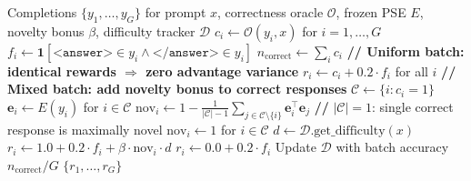 \begin{algorithm}[t]
\caption{SuS Reward Computation}
\label{alg:sus}
\begin{algorithmic}[1]
\REQUIRE Completions $\{y_1, \ldots, y_G\}$ for prompt $x$, correctness oracle $\mathcal{O}$, frozen PSE $E$, novelty bonus $\beta$, difficulty tracker $\mathcal{D}$
\STATE $c_i \gets \mathcal{O}(y_i, x)$ for $i = 1, \ldots, G$ 
\STATE $f_i \gets \mathbf{1}[\texttt{<answer>} \in y_i \wedge \texttt{</answer>} \in y_i]$ 
\STATE $n_{\text{correct}} \gets \sum_{i} c_i$
    \STATE \textbf{// Uniform batch: identical rewards $\Rightarrow$ zero advantage variance}
    \STATE $r_i \gets c_i + 0.2 \cdot f_i$ for all $i$
\ELSE
    \STATE \textbf{// Mixed batch: add novelty bonus to correct responses}
    \STATE $\mathcal{C} \gets \{i : c_i = 1\}$ 
        \STATE $\mathbf{e}_i \gets E(y_i)$ for $i \in \mathcal{C}$ 
        \STATE $\text{nov}_i \gets 1 - \frac{1}{|\mathcal{C}|-1} \sum_{j \in \mathcal{C} \setminus \{i\}} \mathbf{e}_i^\top \mathbf{e}_j$ 
    \ELSE
        \STATE \textbf{//} $|\mathcal{C}| = 1$: single correct response is maximally novel
        \STATE $\text{nov}_i \gets 1$ for $i \in \mathcal{C}$
    \ENDIF
    \STATE $d \gets \mathcal{D}.\text{get\_difficulty}(x)$ 
            \STATE $r_i \gets 1.0 + 0.2 \cdot f_i + \beta \cdot \text{nov}_i \cdot d$
        \ELSE
            \STATE $r_i \gets 0.0 + 0.2 \cdot f_i$
        \ENDIF
    \ENDFOR
\ENDIF
\STATE Update $\mathcal{D}$ with batch accuracy $n_{\text{correct}} / G$
\RETURN $\{r_1, \ldots, r_G\}$
\end{algorithmic}
\end{algorithm}
